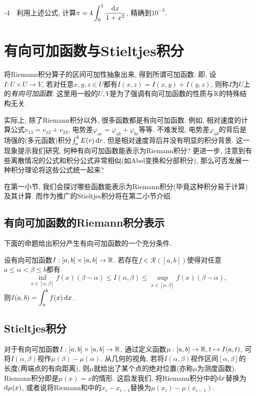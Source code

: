 -4~~利用上述公式, 计算$\displaystyle \pi = 4\int_0^1 \frac{\mathop{}\!\mathrm{d} x}{1+x^2}$, 精确到$10^{-3}$. 


\newpage
\section{有向可加函数与Stieltjes积分}

将Riemann积分算子的区间可加性抽象出来, 得到所谓可加函数. 即, 设$I:U \times U \to V$, 若对任意$x,y,z \in U$都有$I(x,z)=I(x,y)+I(y,z)$, 则称$I$为$U$上的\textit{有向可加函数}. 这里用一般的$U,V$是为了强调有向可加函数的性质与$\mathbb{R}$的特殊结构无关. 

实际上, 除了Riemann积分以外, 很多函数都是有向可加函数. 例如, 相对速度的计算公式$v_{13}=v_{12}+v_{23}$, 电势差$\varphi _{ac}=\varphi _{ab}+\varphi _{bc}$等等. 不难发现, 电势差$\varphi _{ab}$的背后是场强的(多元函数)积分$\int_a^b E(r) \mathop{}\!\mathrm{d} r$, 但是相对速度背后并没有明显的积分背景. 这一现象提示我们研究, 何种有向可加函数能表示为Riemann积分? 更进一步, 注意到有些离散情况的公式和积分公式非常相似(如Abel变换和分部积分), 那么可否发展一种积分理论将这些公式统一起来? 

在第一小节, 我们会探讨哪些函数能表示为Riemann积分(毕竟这种积分易于计算)及其计算. 而作为推广的Stieltjes积分将在第二小节介绍. 

\subsection{有向可加函数的Riemann积分表示}

下面的命题给出积分产生有向可加函数的一个充分条件. 

\begin{proposition}{}
	设有向可加函数$I:[a,b] \times [a,b] \to \mathbb{R}$. 若存在$f \in \mathcal{R}([a,b])$使得对任意$a \leq \alpha < \beta \leq b$都有$$\inf_{x\in [\alpha ,\beta]} f(x) (\beta -\alpha) \leq I(\alpha ,\beta) \leq \sup_{x\in [\alpha ,\beta]} f(x) (\beta -\alpha),$$
	则$\displaystyle I(a,b)=\int_a^b f(x) \mathop{}\!\mathrm{d} x$. 
\end{proposition}

\subsection{Stieltjes积分}

对于有向可加函数$I:[a,b] \times [a,b] \to \mathbb{R}$, 通过定义函数$\mu :[a,b] \to \mathbb{R} ,t \mapsto I(a,t)$, 可将$I(\alpha ,\beta)$视作$\mu (\beta)-\mu (\alpha)$. 从几何的视角, 若将$I(\alpha ,\beta)$视作区间$[\alpha ,\beta ]$的长度(两端点的有向距离), 则$\mu$就给出了某个点的绝对位置(亦称$\mu$为测度函数). Riemann积分即是$\mu (x)=x$的情形. 这启发我们, 将Riemann积分中的$\mathop{}\!\mathrm{d} x$替换为$\mathop{}\!\mathrm{d} \mu (x)$, 或者说将Riemann和中的$x_i-x_{i-1}$替换为$\mu (x_i)- \mu (x_{i-1})$. 

